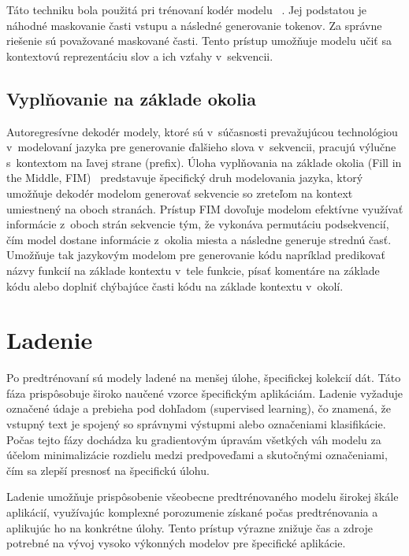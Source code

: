 Táto techniku bola použitá pri trénovaní kodér modelu \BERT{}~\cite{devlin2019bert}. Jej podstatou je náhodné maskovanie časti vstupu a následné generovanie tokenov. Za správne riešenie sú považované maskované časti. Tento prístup umožňuje modelu učiť sa kontextovú reprezentáciu slov a ich vzťahy v~sekvencii.

\subsection*{Vyplňovanie na základe okolia}

Autoregresívne dekodér modely, ktoré sú v~súčasnosti prevažujúcou technológiou v~modelovaní jazyka pre generovanie ďalšieho slova v~sekvencii, pracujú výlučne s~kontextom na ľavej strane (prefix). Úloha vyplňovania na základe okolia (Fill in the Middle, FIM)~\cite{fedus2018maskgan,yang2020xlnet,bavarian2022efficient} predstavuje špecifický druh modelovania jazyka, ktorý umožňuje dekodér modelom generovať sekvencie so zreteľom na kontext umiestnený na oboch stranách. Prístup FIM dovoľuje modelom efektívne využívať informácie z~oboch strán sekvencie tým, že vykonáva permutáciu podsekvencií, čím model dostane informácie z~okolia miesta a následne generuje strednú časť. Umožňuje tak jazykovým modelom pre generovanie kódu napríklad predikovať názvy funkcií na základe kontextu v~tele funkcie, písať komentáre na základe kódu alebo doplniť chýbajúce časti kódu na základe kontextu v~okolí.

\section{Ladenie}

Po predtrénovaní sú modely ladené na menšej úlohe, špecifickej kolekcií dát. Táto fáza prispôsobuje široko naučené vzorce špecifickým aplikáciám. Ladenie vyžaduje označené údaje a prebieha pod dohľadom (supervised learning), čo znamená, že vstupný text je spojený so správnymi výstupmi alebo označeniami klasifikácie. Počas tejto fázy dochádza ku gradientovým úpravám všetkých váh modelu za účelom minimalizácie rozdielu medzi predpoveďami a skutočnými označeniami, čím sa zlepší presnosť na špecifickú úlohu.

Ladenie umožňuje prispôsobenie všeobecne predtrénovaného modelu širokej škále aplikácií, využívajúc komplexné porozumenie získané počas predtrénovania a aplikujúc ho na konkrétne úlohy. Tento prístup výrazne znižuje čas a zdroje potrebné na vývoj vysoko výkonných modelov pre špecifické aplikácie.

